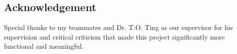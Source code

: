 \documentclass[a0,portrait]{a0poster}
\begin{document}
\begin{multicols}{2}

\section*{Acknowledgement}
\large

Special thanks to my teammates and Dr. T.O. Ting as our supervisor for his supervision and critical criticism that made this project significantly more functional and meaningful.


\end{multicols}
\end{document}
